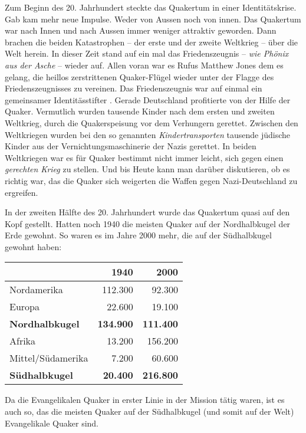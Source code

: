 Zum Beginn des 20. Jahrhundert steckte das Quakertum in einer Identitätskrise.
Gab kam mehr neue Impulse. Weder von Aussen noch von innen. Das Quakertum war
nach Innen und nach Aussen immer weniger attraktiv geworden. Dann brachen die
beiden Katastrophen -- der erste und der zweite Weltkrieg -- über die Welt
herein. In dieser Zeit stand auf ein mal das Friedenszeugnis  -- \textit{wie
Phönix aus der Asche} -- wieder auf. Allen voran war es Rufus Matthew Jones  dem
es gelang, die heillos zerstrittenen Quaker-Flügel wieder unter der Flagge des
Friedenszeugnisses zu vereinen. Das Friedenszeugnis war auf einmal ein
gemeinsamer Identitässtifter . Gerade Deutschland  profitierte von der Hilfe der
Quaker. Vermutlich wurden tausende Kinder nach dem ersten und zweiten Weltkrieg,
durch die Quakerspeisung  vor dem Verhungern gerettet. Zwischen den Weltkriegen
wurden bei den so genannten \textit{Kindertransporten}  tausende jüdische Kinder 
aus der Vernichtungsmaschinerie der Nazis gerettet. In beiden Weltkriegen war es
für Quaker bestimmt nicht immer leicht, sich gegen einen \textit{gerechten
Krieg} zu stellen. Und bis Heute kann man darüber diskutieren, ob es richtig
war, das die Quaker sich weigerten die Waffen gegen Nazi-Deutschland zu
ergreifen.

\medskip

In der zweiten Hälfte des 20. Jahrhundert wurde das Quakertum quasi auf den Kopf
gestellt. Hatten noch 1940 die meisten Quaker auf der Nordhalbkugel der Erde
gewohnt. So waren es im Jahre 2000 mehr, die auf der Südhalbkugel gewohnt haben:

\begin{center}
\begin{tabular}{|l|r|r|} \hline
                        & \textbf{1940}        & \textbf{2000}    \\ \hline
\hline
Nordamerika             & 112.300              & 92.300           \\ \hline
Europa                  & 22.600               & 19.100           \\ \hline
\textbf{Nordhalbkugel}  & \textbf{134.900}     & \textbf{111.400} \\ \hline
Afrika                  & 13.200               & 156.200          \\ \hline
Mittel/Südamerika       & 7.200                & 60.600           \\ \hline
\textbf{Südhalbkugel}   & \textbf{20.400}      & \textbf{216.800} \\ \hline
\end{tabular}
\end{center}


Da die Evangelikalen Quaker in erster Linie in der Mission tätig waren, ist es
auch so, das die meisten Quaker auf der Südhalbkugel (und somit auf der Welt)
Evangelikale Quaker sind.